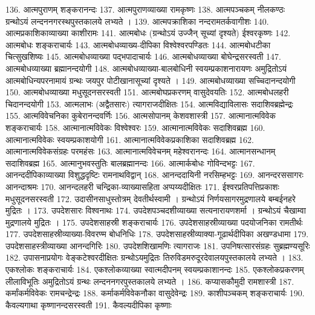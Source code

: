 136. आत्मपुराणम्						शङ्करानन्दः
137. आत्मपुराणव्याख्या					रामकृष्णः
138. आत्मपञ्चकम् 						नीलकण्ठः
	   ग्रन्थोऽयं लन्दननगरस्थपुस्तकालये लभ्यते ।
139. आत्मपक्राशिका					नन्दरामतर्कवागीशः 
140. आत्मप्रकाशिकाव्याख्या 			काशीरामः
141. आत्मबोधः (ग्रन्थोऽयं उज्जैन् सूच्यां दृश्यते) ईश्वरकृष्णः 
142. आत्मबोधः							शङ्कराचार्यः
143. आत्मबोधव्याख्य-दीपिका 		विश्वेश्वरपण्डितः 
144. आत्मबोधटीका						चित्सुखशिष्यः
145. आत्मबोधव्याख्या					पद्भपादाचार्यः
146. आत्मबोधव्याख्या					बोघेन्द्रसरस्वती
147. आत्मबोधव्याख्या					ब्रह्मानन्दयोगी
148. आत्मबोधव्याख्या-बालबोधिनी	स्वयम्प्रकाशनारायणः
	  अमुद्रितोऽयं आत्मबोधिन्यपरनामायं ग्रन्थः जयपुर पोटीखानासूच्यां दृश्यते ।
149. आत्मबोधव्याख्या					सच्चिदानन्दयोगी
150. आत्मबोधव्याख्या					मधुसूदनसरस्वती
151. आत्मबोघप्रकरणम् 					वासुदेवयतिः
152. आत्मबोधलहरी					चिदानन्दयोगी
153.	आत्मलाभः (अद्वैतसारः)			त्यागराजदीक्षितः
154.	आत्मविद्याविलासः				सदाशिवब्रह्मेन्द्रः
155.	आत्मविवेचनिका					कुबेरानन्दवर्णिः
156.	आत्मसोपानम् 					केशवशास्त्री
157.	आत्मानात्मविवेक					शङ्कराचार्यः
158. आत्मानात्मविवेकः					विश्वेश्वरः
159. आत्मानात्मविवेकः					सदाशिवब्रह्म
160. आत्मानात्मविवेकः					स्वयम्प्रकाशयोगी
161. आत्मानात्मविवेकप्रकाशिका 		सदाशिवब्रह्म
162. आत्मानात्मविवेकसंग्रहः			परमहंसः
163. आत्मानात्मविवेचनम् 				महेश्वरानन्दः
164.	आत्मानसन्धानम् 				सदाशिवब्रह्म
165.	आत्मानुभवस्तुतिः				बालब्रह्मानन्दः
166.	आत्मार्कबोधः						गोविन्दभट्टः
167. आनन्ददीपिकाव्याख्या विशुद्धदृष्टिः रामनाथविद्वान् 
168. आनन्ददायिनी						नरसिम्हभट्टः
169. आनन्दरससागरः					आनन्दाश्रमः
170. आनन्दलहरी चन्द्रिका-व्याख्यासहिता अप्पय्यदीक्षितः
171. ईश्वरप्रतिपत्तिप्रकाशः				मधुसूदनसरस्वती
172. उदासीनसाधुस्तोत्रम् देवतीर्थस्वामी । ग्रन्थोऽयं निर्णयसागरमुद्रणालये बम्बईनहरे मुद्रितः ।
173. उपदेशसारः 						विश्वनाथः
174. उपदेशपञ्चदशीव्याख्या सत्यनारायणशर्मा । ग्रन्थोऽयं चैखाम्वा मुद्रणालये मुद्रितः ।
175. उपदेशसाहस्री						शङ्कराचार्यः
176. उपदेशसाहस्रीव्याख्या पदयोजनिका रामतीर्थः
177. उपदेशसाहस्रीव्याख्या-विवरण्म 	बोधनिधिः
178. उपदेशसाहस्रीव्याक्या-गूढार्थदीपिका	अखण्डधामा
179. उपदेशसाहस्त्रीव्याख्या				आनन्दगिरिः
180.	उपदेशशिखामणिः					त्यागराजः
181.	उपनिषत्सारसंग्रहः				सुब्रह्मण्यसूरिः
182.  उपासनाप्रयोगः					वेङ्कटेश्वरदीक्षितः
		ग्रन्थोऽयमुद्रितः तिरुविडमरुदूरदेवालयपुस्तकालये लभ्यते । 
183. एकश्लोकः							शङ्कराचार्यः
184. एकश्लोकव्याख्या स्वात्मदीपनम्	स्वयम्प्रकाशानन्दः
185.	एकश्लोकप्रकरणम् 				लीलाविभूतिः
अमुद्रितोऽयं ग्रन्थः लन्दननगरपुस्तकालये लभ्यते । 	
186. कप्यासकौमुदी 					रामशास्त्री
187.	कर्मांकर्मविवेकः					रामचन्द्रेन्द्रः
188. कर्माकर्मविवेकनौका 				वासुदेवेन्द्रः
189.	काशीपञ्चकम्						शङ्कराचार्यः
190.	कैवल्यगाथा						कृष्णानन्दसरस्वती
191.	कैवल्यदीपिका					कृष्णाः
